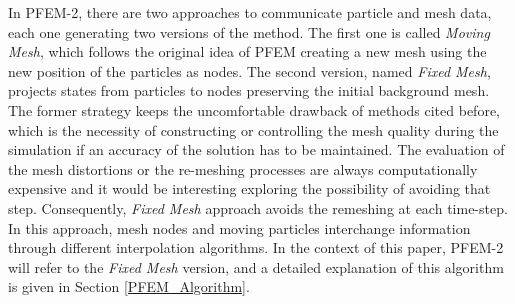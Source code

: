 In PFEM-2, there are two approaches to communicate particle and mesh data, each one generating two versions of the method. The first one is called \textit{Moving Mesh}, which follows the original idea of PFEM creating a new mesh using the new position of the particles as nodes. The second version, named \textit{Fixed Mesh}, projects states from particles to nodes preserving the initial background mesh. The former strategy keeps the uncomfortable drawback of methods cited before, which is the necessity of constructing or controlling the mesh quality during the simulation if an accuracy of the solution has to be maintained. The evaluation of the mesh distortions or the re-meshing processes are always computationally expensive and it would be interesting exploring the possibility of avoiding that step. Consequently, \textit{Fixed Mesh} approach avoids the remeshing at each time-step. In this approach, mesh nodes and moving particles interchange information through different interpolation algorithms. In the context of this paper, PFEM-2 will refer to the \textit{Fixed Mesh} version, and a detailed explanation of this algorithm is given in Section \ref{PFEM_Algorithm}.


